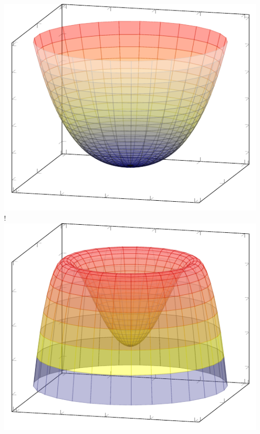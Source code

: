 {{\includegraphics[scale=1]{SM/pp.pdf}
}
\resizebox {\marginparwidth} {!} 
{
\includegraphics[scale=1]{SM/pm.pdf}
}}
